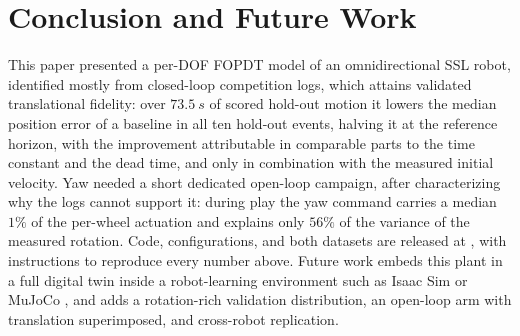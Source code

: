 \section{Conclusion and Future Work}
\label{sec:conclusion}

This paper presented a per-DOF FOPDT model of an omnidirectional SSL robot, identified mostly from closed-loop competition logs, which attains validated translational fidelity: over $\SI{73.5}{s}$ of scored hold-out motion it lowers the median position error of a baseline in all ten hold-out events, halving it at the reference horizon, with the improvement attributable in comparable parts to the time constant and the dead time, and only in combination with the measured initial velocity.
Yaw needed a short dedicated open-loop campaign, after characterizing why the logs cannot support it: during play the yaw command carries a median $1\%$ of the per-wheel actuation and explains only $56\%$ of the variance of the measured rotation. Code, configurations, and both datasets are released at
\repolink, with instructions to reproduce every number above. Future work embeds this plant in a full digital twin inside a robot-learning environment such as Isaac Sim or MuJoCo \cite{machado2025planning}, and adds a rotation-rich validation distribution, an open-loop arm with translation superimposed, and cross-robot replication.


